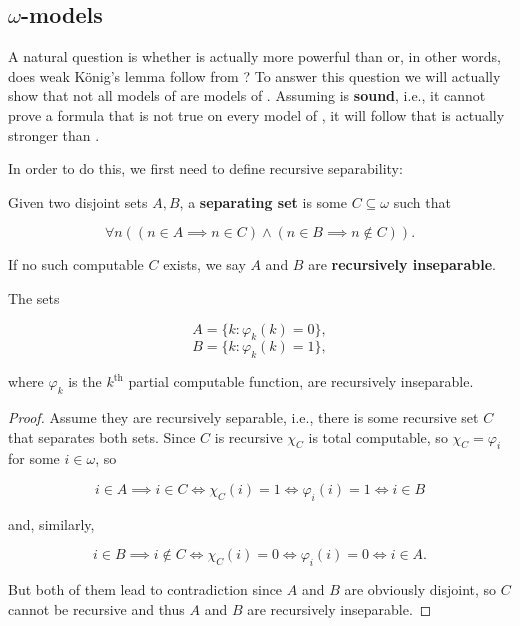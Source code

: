\documentclass[../main.tex]{memoir}
\begin{document}
\subsection{$\omega$-models}

A natural question is whether \wkl is actually more powerful than \rca or, in other words, does weak König's lemma follow from \rca? To answer this question we will actually show that not all models of \rca are models of \wkl. Assuming \rca is \textbf{sound}, i.e., it cannot prove a formula that is not true on every model of \rca, it will follow that \wkl is actually stronger than \rca.

In order to do this, we first need to define recursive separability:

\begin{definition}
  Given two disjoint sets $A, B$, a \textbf{separating set} is some $C \subseteq \omega$ such that

  \[ \forall n ((n \in A \implies n \in C) \land (n \in B \implies n \not\in C)). \]

  If no such computable $C$ exists, we say $A$ and $B$ are \textbf{recursively inseparable}.
\end{definition}

\begin{lemma}
  \label{lemma:recursively-inseparable}

  The sets

  \[ A = \{k: \varphi_k(k) = 0\}, \]
  \[ B = \{k: \varphi_k(k) = 1\}, \]

  where $\varphi_k$ is the $k^{\text{th}}$ partial computable function, are recursively inseparable.
\end{lemma}
\begin{proof}
  Assume they are recursively separable, i.e., there is some recursive set $C$ that separates both sets. Since $C$ is recursive $\chi_C$ is total computable, so $\chi_C = \varphi_i$ for some $i \in \omega$, so

  \[ i \in A \implies i \in C \iff \chi_C(i) = 1 \iff \varphi_i(i) = 1 \iff i \in B \]

  and, similarly,

  \[ i \in B \implies i \not\in C \iff \chi_C(i) = 0 \iff \varphi_i(i) = 0 \iff i \in A. \]

  But both of them lead to contradiction since $A$ and $B$ are obviously disjoint, so $C$ cannot be recursive and thus $A$ and $B$ are recursively inseparable.
\end{proof}
\end{document}
